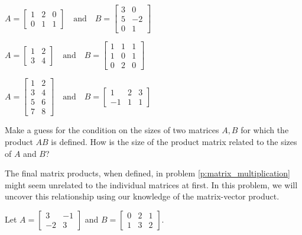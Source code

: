 \begin{pa}
	\item $A = \left[ \begin{array}{ccc} 1&2&0 \\ 0&1&1 \end{array} \right]  \ \ \ \text{ and } \ \ \ B = \left[ \begin{array}{crc} 3&0\\5&-2 \\ 0&1 \end{array} \right]$


 \item $A = \left[ \begin{array}{cc} 1 & 2 \\ 3 & 4\end{array} \right]  \ \ \ \text{ and } \ \ \ B = \left[ \begin{array}{ccc}
1 & 1 & 1 \\1 & 0 & 1 \\ 0 & 2 & 0\end{array} \right]$

 \item $A = \left[ \begin{array}{cc} 1 & 2 \\ 3 & 4 \\ 5 & 6 \\ 7 & 8 \end{array} \right]  \ \ \ \text{ and } \ \ \ B = \left[ \begin{array}{rcc} 1 & 2 & 3 \\ -1 & 1 & 1\end{array} \right]$

  \item Make a guess for the condition on the sizes of two matrices $A, B$ for which the product $AB$ is defined. How is the size of the product matrix related to the sizes of $A$ and $B$?


	\ea

\item The final matrix products, when defined, in problem \ref{p:matrix_multiplication} might seem unrelated to the individual matrices at first. In this problem, we will uncover this relationship using our knowledge of the matrix-vector product.

Let $A = \left[ \begin{array}{rr} 3 & -1 \\ -2 & 3 \end{array} \right]$ and $B = \left[ \begin{array}{ccc} 0 & 2 & 1 \\ 1 & 3 & 2\end{array} \right]$. 


\end{pa}
